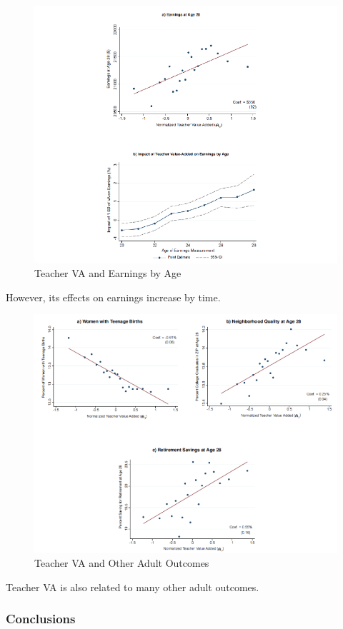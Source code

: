             \begin{figure}[H]
                \centering
                \includegraphics[width=4.5in]{images/ch9/9 chetty 2014 2.png}
                \caption{Teacher VA and Earnings by Age}
            \end{figure}
            However, its effects on earnings increase by time.
            \begin{figure}[H]
                \centering
                \includegraphics[width=4.5in]{images/ch9/9 chetty 2014 3.png}
                \caption{Teacher VA and Other Adult Outcomes}
            \end{figure}
            Teacher VA is also related to many other adult outcomes.

        \subsubsection{Conclusions}

